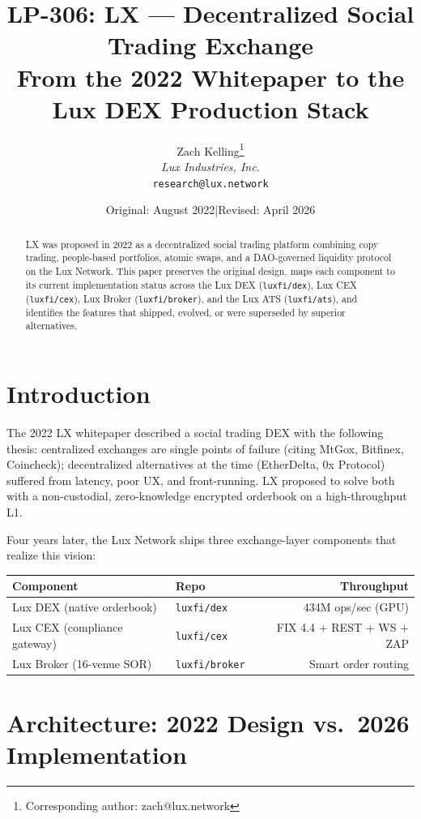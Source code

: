 \documentclass[11pt,a4paper]{article}
\title{LP-306: LX --- Decentralized Social Trading Exchange\\[4pt]
\large From the 2022 Whitepaper to the Lux DEX Production Stack}
\author{
Zach Kelling\thanks{Corresponding author: zach@lux.network}\\
\textit{Lux Industries, Inc.}\\
\texttt{research@lux.network}
}
\date{Original: August 2022\quad|\quad Revised: April 2026}
\begin{document}
\luxcoverpage

\begin{abstract}
LX was proposed in 2022 as a decentralized social trading platform
combining copy trading, people-based portfolios, atomic swaps, and
a DAO-governed liquidity protocol on the Lux Network. This paper
preserves the original design, maps each component to its current
implementation status across the Lux DEX
(\texttt{luxfi/dex}), Lux CEX (\texttt{luxfi/cex}), Lux Broker
(\texttt{luxfi/broker}), and the Lux ATS (\texttt{luxfi/ats}), and
identifies the features that shipped, evolved, or were superseded by
superior alternatives.
\end{abstract}

\tableofcontents
\newpage

\section{Introduction}

The 2022 LX whitepaper described a social trading DEX with the
following thesis: centralized exchanges are single points of failure
(citing MtGox, Bitfinex, Coincheck); decentralized alternatives
at the time (EtherDelta, 0x Protocol) suffered from latency, poor
UX, and front-running. LX proposed to solve both with a non-custodial,
zero-knowledge encrypted orderbook on a high-throughput L1.

Four years later, the Lux Network ships three exchange-layer
components that realize this vision:

\begin{center}
\begin{tabular}{llr}
\toprule
\textbf{Component} & \textbf{Repo} & \textbf{Throughput} \\
\midrule
Lux DEX (native orderbook) & \texttt{luxfi/dex} & 434M ops/sec (GPU) \\
Lux CEX (compliance gateway) & \texttt{luxfi/cex} & FIX 4.4 + REST + WS + ZAP \\
Lux Broker (16-venue SOR) & \texttt{luxfi/broker} & Smart order routing \\
\bottomrule
\end{tabular}
\end{center}

\section{Architecture: 2022 Design vs.\ 2026 Implementation}
\end{document}
